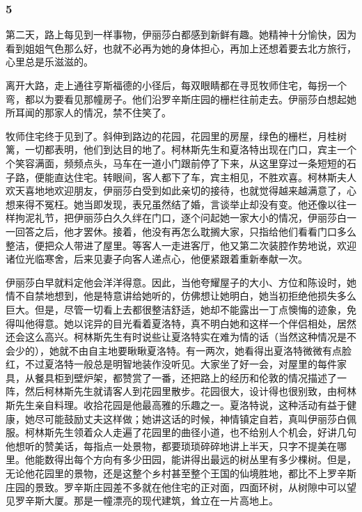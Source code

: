 \subsubsection*{5}


\par 第二天，路上每见到一样事物，伊丽莎白都感到新鲜有趣。她精神十分愉快，因为看到姐姐气色那么好，也就不必再为她的身体担心，再加上还想着要去北方旅行，心里总是乐滋滋的。
\par 离开大路，走上通往亨斯福德的小径后，每双眼睛都在寻觅牧师住宅，每拐一个弯，都以为要看见那幢房子。他们沿罗辛斯庄园的栅栏往前走去。伊丽莎白想起她所耳闻的那家人的情况，禁不住笑了。
\par 牧师住宅终于见到了。斜伸到路边的花园，花园里的房屋，绿色的栅栏，月桂树篱，一切都表明，他们到达目的地了。柯林斯先生和夏洛特出现在门口，宾主一个个笑容满面，频频点头，马车在一道小门跟前停了下来，从这里穿过一条短短的石子路，便能直达住宅。转眼间，客人都下了车，宾主相见，不胜欢喜。柯林斯夫人欢天喜地地欢迎朋友，伊丽莎白受到如此亲切的接待，也就觉得越来越满意了，心想来得不冤枉。她当即发现，表兄虽然结了婚，言谈举止却没有变。他还像以往一样拘泥礼节，把伊丽莎白久久绊在门口，逐个问起她一家大小的情况，伊丽莎白一一回答之后，他才罢休。接着，他没有再怎么耽搁大家，只指给他们看看门口多么整洁，便把众人带进了屋里。等客人一走进客厅，他又第二次装腔作势地说，欢迎诸位光临寒舍，后来见妻子向客人递点心，他便紧跟着重新奉献一次。
\par 伊丽莎白早就料定他会洋洋得意。因此，当他夸耀屋子的大小、方位和陈设时，她情不自禁地想到，他是特意讲给她听的，仿佛想让她明白，她当初拒绝他损失多么巨大。但是，尽管一切看上去都很整洁舒适，她却不能露出一丁点懊悔的迹象，免得叫他得意。她以诧异的目光看着夏洛特，真不明白她和这样一个伴侣相处，居然还会这么高兴。柯林斯先生有时说些让夏洛特实在难为情的话（当然这种情况是不会少的），她就不由自主地要瞅瞅夏洛特。有一两次，她看得出夏洛特微微有点脸红，不过夏洛特一般总是明智地装作没听见。大家坐了好一会，对屋里的每件家具，从餐具柜到壁炉架，都赞赏了一番，还把路上的经历和伦敦的情况描述了一阵，然后柯林斯先生就请客人到花园里散步。花园很大，设计得也很别致，由柯林斯先生亲自料理。收拾花园是他最高雅的乐趣之一。夏洛特说，这种活动有益于健康，她尽可能鼓励丈夫这样做；她讲这话的时候，神情镇定自若，真叫伊丽莎白佩服。柯林斯先生领着众人走遍了花园里的曲径小道，也不给别人个机会，好讲几句他想听的赞美话，每指点一处景物，都要琐琐碎碎地讲上半天，只字不提美在哪里。他能数得出每个方向有多少田园，能讲得出最远的树丛里有多少棵树。但是，无论他花园里的景物，还是这整个乡村甚至整个王国的仙境胜地，都比不上罗辛斯庄园的景致。罗辛斯庄园差不多就在他住宅的正对面，四面环树，从树隙中可以望见罗辛斯大厦。那是一幢漂亮的现代建筑，耸立在一片高地上。
